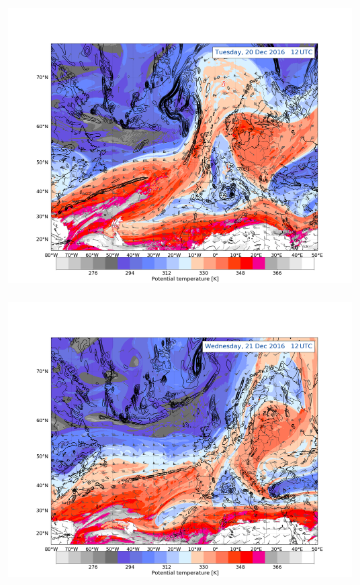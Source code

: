 \begin{figure}[t!]
	\centering
	\begin{subfigure}[b]{0.49\textwidth}
		\includegraphics[trim={4.2cm 3.9cm 4.3cm 5.1cm},clip,
		width=\textwidth]{./fig_DynTropo/20161220_12}
		\caption{} \label{fig:DT20}
	\end{subfigure}
	\begin{subfigure}[b]{0.49\textwidth}
		\includegraphics[trim={4.2cm 3.9cm 4.3cm 5.1cm},clip,
		width=\textwidth]{./fig_DynTropo/20161221_12}
		\caption{}\label{fig:DT21}
	\end{subfigure}
	

\end{figure}

